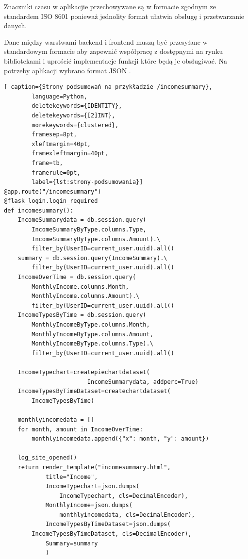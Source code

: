 \documentclass[a4paper, 10pt, twoside, openright]{report}
\begin{document}
\begin{large}
{Znaczniki czasu w aplikacjie przechowywane są w formacie zgodnym ze standardem 
ISO 8601 \cite{ISO 8601} ponieważ jednolity format ułatwia obsługę i 
przetwarzanie danych.}

{Dane między warstwami backend i frontend muszą być przesyłane w standardowym 
formacie aby zapewnić współpracę z dostępnymi na rynku bibliotekami i uprościć 
implementacje funkcji które będą je obsługiwać. Na potrzeby aplikacji wybrano 
format JSON \cite{JSON}.}

\begin{minipage}{\textwidth}
    \begin{lstlisting}[ caption={Strony podsumowań na przykładzie /incomesummary},
        language=Python,
        deletekeywords={IDENTITY},
        deletekeywords={[2]INT},
        morekeywords={clustered},
        framesep=8pt,
        xleftmargin=40pt,
        framexleftmargin=40pt,
        frame=tb,
        framerule=0pt,
        label={lst:strony-podsumowania}]
@app.route("/incomesummary")
@flask_login.login_required
def incomesummary():
    IncomeSummarydata = db.session.query(
        IncomeSummaryByType.columns.Type,
        IncomeSummaryByType.columns.Amount).\
        filter_by(UserID=current_user.uuid).all()
    summary = db.session.query(IncomeSummary).\
        filter_by(UserID=current_user.uuid).all()
    IncomeOverTime = db.session.query(
        MonthlyIncome.columns.Month,
        MonthlyIncome.columns.Amount).\
        filter_by(UserID=current_user.uuid).all()
    IncomeTypesByTime = db.session.query(
        MonthlyIncomeByType.columns.Month,
        MonthlyIncomeByType.columns.Amount,
        MonthlyIncomeByType.columns.Type).\
        filter_by(UserID=current_user.uuid).all()
    
    IncomeTypechart=createpiechartdataset(
                        IncomeSummarydata, addperc=True)
    IncomeTypesByTimeDataset=createchartdataset(
        IncomeTypesByTime)

    monthlyincomedata = []
    for month, amount in IncomeOverTime:
        monthlyincomedata.append({"x": month, "y": amount})

    log_site_opened()
    return render_template("incomesummary.html",
            title="Income",
            IncomeTypechart=json.dumps(
                IncomeTypechart, cls=DecimalEncoder),
            MonthlyIncome=json.dumps(
                monthlyincomedata, cls=DecimalEncoder),
            IncomeTypesByTimeDataset=json.dumps(
        IncomeTypesByTimeDataset, cls=DecimalEncoder),
            Summary=summary
            )\end{lstlisting}
\end{minipage}


\end{large}
\end{document}

